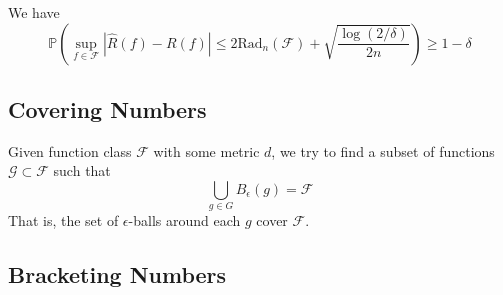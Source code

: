   \begin{theorem}
    We have 
    \begin{equation}
      \mathbb{P} \left( \sup_{f \in \mathcal{F}} |\hat{R} (f) - R(f)| \leq 2 \mathrm{Rad}_n (\mathcal{F}) + \sqrt{\frac{\log (2 / \delta)}{2 n}} \right) \geq 1 - \delta
    \end{equation}
  \end{theorem}

\subsection{Covering Numbers} 

  Given function class $\mathcal{F}$ with some metric $d$, we try to find a subset of functions $\mathcal{G} \subset \mathcal{F}$ such that 
  \begin{equation}
    \bigcup_{g \in G} B_\epsilon(g) = \mathcal{F}
  \end{equation}
  That is, the set of $\epsilon$-balls around each $g$ cover $\mathcal{F}$. 

\subsection{Bracketing Numbers} 

  
